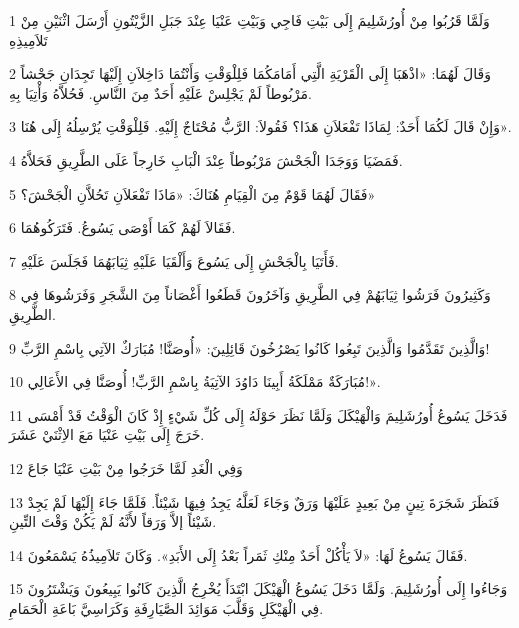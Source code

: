 \par 1 وَلَمَّا قَرُبُوا مِنْ أُورُشَلِيمَ إِلَى بَيْتِ فَاجِي وَبَيْتِ عَنْيَا عِنْدَ جَبَلِ الزَّيْتُونِ أَرْسَلَ اثْنَيْنِ مِنْ تَلاَمِيذِهِ
\par 2 وَقَالَ لَهُمَا: «اذْهَبَا إِلَى الْقَرْيَةِ الَّتِي أَمَامَكُمَا فَلِلْوَقْتِ وَأَنْتُمَا دَاخِلاَنِ إِلَيْهَا تَجِدَانِ جَحْشاً مَرْبُوطاً لَمْ يَجْلِسْ عَلَيْهِ أَحَدٌ مِنَ النَّاسِ. فَحُلاَّهُ وَأْتِيَا بِهِ.
\par 3 وَإِنْ قَالَ لَكُمَا أَحَدٌ: لِمَاذَا تَفْعَلاَنِ هَذَا؟ فَقُولاَ: الرَّبُّ مُحْتَاجٌ إِلَيْهِ. فَلِلْوَقْتِ يُرْسِلُهُ إِلَى هُنَا».
\par 4 فَمَضَيَا وَوَجَدَا الْجَحْشَ مَرْبُوطاً عِنْدَ الْبَابِ خَارِجاً عَلَى الطَّرِيقِ فَحَلاَّهُ.
\par 5 فَقَالَ لَهُمَا قَوْمٌ مِنَ الْقِيَامِ هُنَاكَ: «مَاذَا تَفْعَلاَنِ تَحُلاَّنِ الْجَحْشَ؟»
\par 6 فَقَالاَ لَهُمْ كَمَا أَوْصَى يَسُوعُ. فَتَرَكُوهُمَا.
\par 7 فَأَتَيَا بِالْجَحْشِ إِلَى يَسُوعَ وَأَلْقَيَا عَلَيْهِ ثِيَابَهُمَا فَجَلَسَ عَلَيْهِ.
\par 8 وَكَثِيرُونَ فَرَشُوا ثِيَابَهُمْ فِي الطَّرِيقِ وَآخَرُونَ قَطَعُوا أَغْصَاناً مِنَ الشَّجَرِ وَفَرَشُوهَا فِي الطَّرِيقِ.
\par 9 وَالَّذِينَ تَقَدَّمُوا وَالَّذِينَ تَبِعُوا كَانُوا يَصْرُخُونَ قَائِلِينَ: «أُوصَنَّا! مُبَارَكٌ الآتِي بِاسْمِ الرَّبِّ!
\par 10 مُبَارَكَةٌ مَمْلَكَةُ أَبِينَا دَاوُدَ الآتِيَةُ بِاسْمِ الرَّبِّ! أُوصَنَّا فِي الأَعَالِي!».
\par 11 فَدَخَلَ يَسُوعُ أُورُشَلِيمَ وَالْهَيْكَلَ وَلَمَّا نَظَرَ حَوْلَهُ إِلَى كُلِّ شَيْءٍ إِذْ كَانَ الْوَقْتُ قَدْ أَمْسَى خَرَجَ إِلَى بَيْتِ عَنْيَا مَعَ الاِثْنَيْ عَشَرَ.
\par 12 وَفِي الْغَدِ لَمَّا خَرَجُوا مِنْ بَيْتِ عَنْيَا جَاعَ
\par 13 فَنَظَرَ شَجَرَةَ تِينٍ مِنْ بَعِيدٍ عَلَيْهَا وَرَقٌ وَجَاءَ لَعَلَّهُ يَجِدُ فِيهَا شَيْئاً. فَلَمَّا جَاءَ إِلَيْهَا لَمْ يَجِدْ شَيْئاً إلاَّ وَرَقاً لأَنَّهُ لَمْ يَكُنْ وَقْتَ التِّينِ.
\par 14 فَقَالَ يَسُوعُ لَهَا: «لاَ يَأْكُلْ أَحَدٌ مِنْكِ ثَمَراً بَعْدُ إِلَى الأَبَدِ». وَكَانَ تَلاَمِيذُهُ يَسْمَعُونَ.
\par 15 وَجَاءُوا إِلَى أُورُشَلِيمَ. وَلَمَّا دَخَلَ يَسُوعُ الْهَيْكَلَ ابْتَدَأَ يُخْرِجُ الَّذِينَ كَانُوا يَبِيعُونَ وَيَشْتَرُونَ فِي الْهَيْكَلِ وَقَلَّبَ مَوَائِدَ الصَّيَارِفَةِ وَكَرَاسِيَّ بَاعَةِ الْحَمَامِ.
